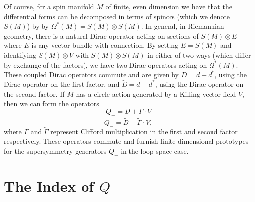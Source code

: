 Of course, for a  spin manifold $M$ of finite, even dimension we have that the
differential forms can be decomposed in terms of spinors (which we denote
$S(M)$) by
by $\Omega^*(M)=S(M)\otimes S(M)$. 
In general, in Riemannian geometry, there is a natural Dirac operator
acting on sections of $S(M)\otimes E$ where $E$ is any vector bundle
with connection.  By setting $E=S(M)$ and identifying $S(M)\otimes V$
with $S(M)\otimes S(M)$ in either of two ways (which differ by exchange
of the factors), 
we have two Dirac
operators acting on $\Omega^*(M)$.
 These coupled Dirac
operators commute and are given  by $D=d+d^*$, using the Dirac
operator on the first factor, and $\tilde D =
d-d^*$, using the Dirac operator on the second factor. 
If $M$ has a circle action generated by a Killing vector field $V$, then
we can form the operators
$$Q_+=D+\Gamma\cdot V$$
$$Q_-=\tilde D-\tilde\Gamma\cdot V,$$
where $\Gamma$ and $\tilde\Gamma$ represent Clifford multiplication
in the first and second factor respectively.
These operators commute and furnish finite-dimensional prototypes
for the supersymmetry generators $Q_\pm$ in the loop space case.

\section{The Index of $Q_+$}

